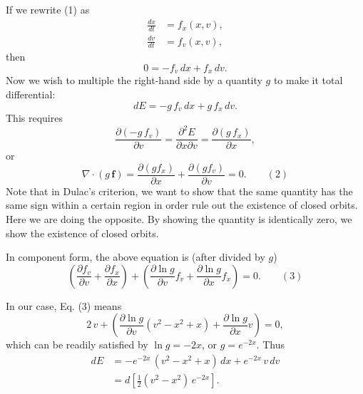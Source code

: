 \documentclass{article}
\begin{document}
If we rewrite (1) as
$$
\begin{aligned}
\frac{dx}{dt} &= f_x(x, v), \\
\frac{dv}{dt} &= f_v(x, v),
\end{aligned}
$$
then
$$
0 = -f_v \, dx + f_x \, dv.
$$
Now we wish to multiple the right-hand side by a quantity $g$
to make it total differential:
$$
dE = -g \, f_v \, dx + g \, f_x \, dv.
$$
This requires
$$
\frac{\partial (-g \, f_v)}{\partial v}
=
\frac{\partial^2 E}{\partial x \partial v}
=
\frac{\partial (g \, f_x)}{\partial x},
$$
or
$$
\nabla \cdot (g \, \mathbf f)
=
\frac{\partial (g f_x)}{\partial x}
+\frac{\partial (g f_v)}{\partial v}
= 0.
\quad \quad (2)
$$
Note that in Dulac's criterion, we want to show that the same quantity has the same sign within a certain region in order rule out the existence of closed orbits.  Here we are doing the opposite.  By showing the quantity is identically zero, we show the existence of closed orbits.

In component form, the above equation is (after divided by $g$)
$$
\left( \frac{\partial f_v}{\partial v}
+\frac{\partial f_x}{\partial x} \right)
+\left(
\frac{\partial \ln g }{\partial v} f_v
+\frac{\partial \ln g }{\partial x} f_x
\right)
=0.
\quad \quad (3)
$$


In our case, Eq. (3) means
$$
2 \, v
+\left(
\frac{\partial \ln g }{\partial v} (v^2 - x^2 + x)
+\frac{\partial \ln g }{\partial x} v
\right)
=0,
$$
which can be readily satisfied by $\ln g = -2 x$, or $g = e^{-2x}$.  Thus
$$
\begin{aligned}
dE
&= -e^{-2x} \, (v^2 - x^2 + x) \, dx + e^{-2x} \, v \, dv \\
&= d\left[ \frac12(v^2 - x^2) \, e^{-2x} \right].
\end{aligned}
$$
\end{document}
